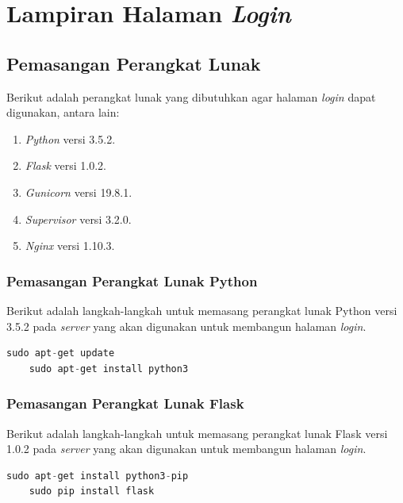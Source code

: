 \renewcommand\chaptername{LAMPIRAN}
\label{lampiranisntalasihalamanlogin}
\chapter{Lampiran Halaman \textit{Login}}
\section{Pemasangan Perangkat Lunak}
Berikut adalah perangkat lunak yang dibutuhkan agar halaman \textit{login} dapat digunakan, antara lain:
\begin{enumerate}
	\item \textit{Python} versi 3.5.2.
	\item \textit{Flask} versi 1.0.2.
	\item \textit{Gunicorn} versi 19.8.1.
	\item \textit{Supervisor} versi 3.2.0.
	\item \textit{Nginx} versi 1.10.3.
\end{enumerate}

\subsection{Pemasangan Perangkat Lunak Python}
Berikut adalah langkah-langkah untuk memasang perangkat lunak Python versi 3.5.2 pada \textit{server} yang akan digunakan untuk membangun halaman \textit{login}.\\
\begin{minipage}{\linewidth}
	\begin{lstlisting}[caption=Command untuk installasi Python,language=Python,label=installpython3diserverlogin]
	sudo apt-get update
	sudo apt-get install python3
	\end{lstlisting}
\end{minipage}

\subsection{Pemasangan Perangkat Lunak Flask}
Berikut adalah langkah-langkah untuk memasang perangkat lunak Flask versi 1.0.2 pada \textit{server} yang akan digunakan untuk membangun halaman \textit{login}.\\
\begin{minipage}{\linewidth}
	\begin{lstlisting}[caption=Command untuk installasi Flask,language=Python,label=installflaskdiserverlogin]
	sudo apt-get install python3-pip
	sudo pip install flask
	\end{lstlisting}
\end{minipage}

